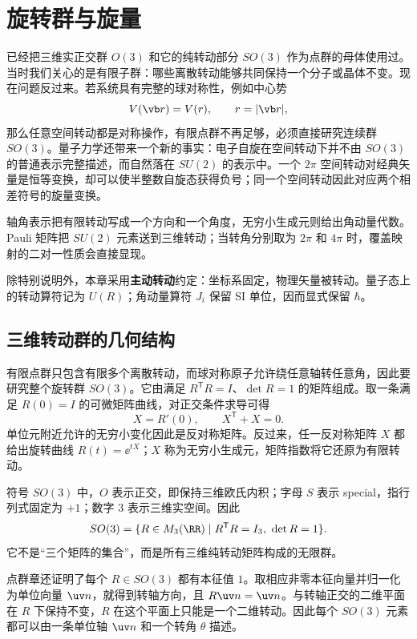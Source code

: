 \chapter{旋转群与旋量}
\label{chap:rotation-group}

已经把三维实正交群 $O(3)$ 和它的纯转动部分 $SO(3)$ 作为点群的母体使用过。当时我们关心的是有限子群：哪些离散转动能够共同保持一个分子或晶体不变。现在问题反过来。若系统具有完整的球对称性，例如中心势
\[
V(\vb r)=V(r),\qquad r=\lvert\vb r\rvert,
\]
那么任意空间转动都是对称操作，有限点群不再足够，必须直接研究连续群 $SO(3)$。量子力学还带来一个新的事实：电子自旋在空间转动下并不由 $SO(3)$ 的普通表示完整描述，而自然落在 $SU(2)$ 的表示中。一个 \(2\pi\) 空间转动对经典矢量是恒等变换，却可以使半整数自旋态获得负号；同一个空间转动因此对应两个相差符号的旋量变换。

轴角表示把有限转动写成一个方向和一个角度，无穷小生成元则给出角动量代数。Pauli 矩阵把 \(SU(2)\) 元素送到三维转动；当转角分别取为 \(2\pi\) 和 \(4\pi\) 时，覆盖映射的二对一性质会直接显现。

除特别说明外，本章采用\textbf{主动转动}约定：坐标系固定，物理矢量被转动。量子态上的转动算符记为 $U(R)$；角动量算符 $J_i$ 保留 SI 单位，因而显式保留 $\hbar$。
\section{三维转动群的几何结构}
\label{sec:so3-geometry}

有限点群只包含有限多个离散转动，而球对称原子允许绕任意轴转任意角，因此要研究整个旋转群 $SO(3)$。它由满足 $R^{\mathsf T}R=I$、$\det R=1$ 的矩阵组成。取一条满足 $R(0)=I$ 的可微矩阵曲线，对正交条件求导可得
\[
X=R'(0),\qquad X^{\mathsf T}+X=0.
\]
单位元附近允许的无穷小变化因此是反对称矩阵。反过来，任一反对称矩阵 $X$ 都给出旋转曲线 $R(t)=\ee^{tX}$；$X$ 称为无穷小生成元，矩阵指数将它还原为有限转动。

符号 $SO(3)$ 中，$O$ 表示正交，即保持三维欧氏内积；字母 $S$ 表示 special，指行列式固定为 $+1$；数字 $3$ 表示三维实空间。因此
\begin{equation}
SO(3)=\{R\in M_{3}(\RR)\mid R^{\mathsf T}R=I_3,\ \det R=1\}.
\label{eq:so3-definition}
\end{equation}
它不是“三个矩阵的集合”，而是所有三维纯转动矩阵构成的无限群。

点群章还证明了每个 $R\in SO(3)$ 都有本征值 $1$。取相应非零本征向量并归一化为单位向量 $\uv n$，就得到转轴方向，且 $R\uv n=\uv n$。与转轴正交的二维平面在 $R$ 下保持不变，$R$ 在这个平面上只能是一个二维转动。因此每个 $SO(3)$ 元素都可以由一条单位轴 $\uv n$ 和一个转角 $\theta$ 描述。

